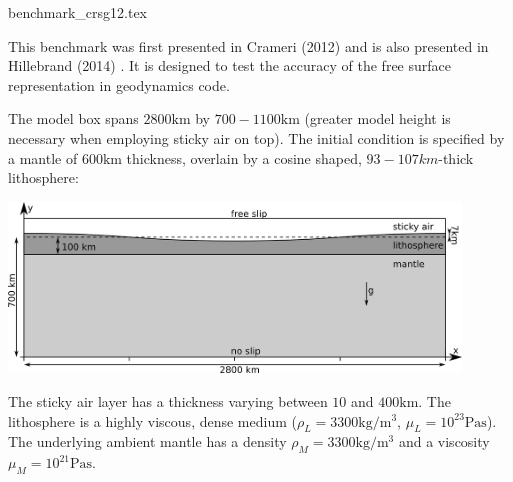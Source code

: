 \begin{flushright} {\tiny {\color{gray} benchmark\_crsg12.tex}} \end{flushright}

This benchmark was first presented in Crameri \etal (2012) \cite{crsg12} 
and is also presented in Hillebrand \etal (2014) \cite{hitg14}.
It is designed to test the accuracy of the free surface representation in geodynamics code.

The model box spans $2800\si{\km}$ by $700-1100\si{\km}$ 
(greater model height is necessary when employing sticky air on top). 
The initial condition is specified by a mantle of $600\si{\km}$ thickness, overlain by a cosine shaped, 
$93-107\si{km}$-thick lithosphere:

\begin{center}
\includegraphics[width=12cm]{images/benchmark_crsg12/setup}
\end{center}

The sticky air layer has a thickness varying between $10$ and $400\si{\km}$. 
The lithosphere is a highly viscous, dense medium 
($\rho_L=3300\si{\kg\per\cubic\metre}$, $\mu_L=10^{23} \si{\pascal\second}$). 
The underlying ambient mantle has a density $\rho_M =3300\si{\kg\per\cubic\metre}$ 
and a viscosity $\mu_M =10^{21}\si{\pascal\second}$. 

